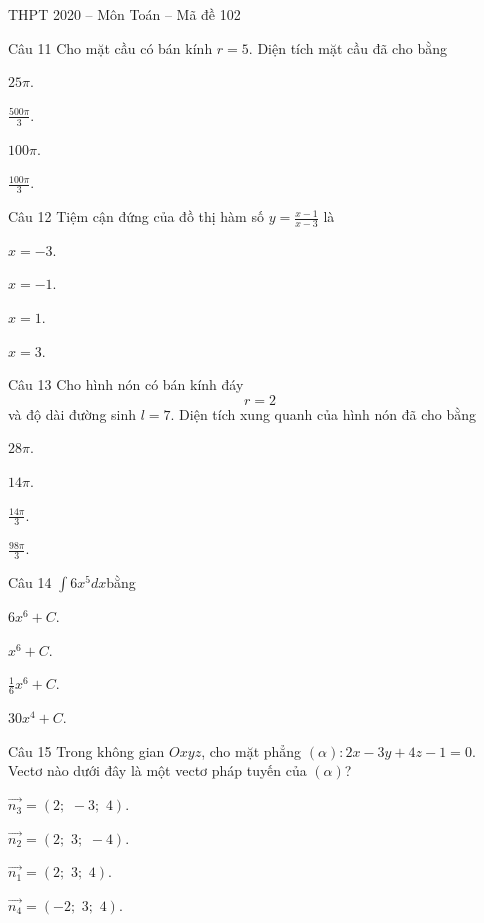\documentclass{book}
\begin{document}
\begin{quiz}{THPT 2020 – Môn Toán – Mã đề 102}
\begin{multi}[points=1]{Câu 11}
 Cho mặt cầu có bán kính $r=5$. Diện tích mặt cầu đã cho bằng

\item  $25\pi $.	
\item  $\frac{500\pi }{3}$.	
\item*  $100\pi $.	
\item  $\frac{100\pi }{3}$.
\end{multi}

\begin{multi}[points=1]{Câu 12}
 Tiệm cận đứng của đồ thị hàm số $y=\frac{x-1}{x-3}$ là

\item  $x=-3$.	
\item  $x=-1$.	
\item  $x=1$.	
\item*  $x=3$.
\end{multi}

\begin{multi}[points=1]{Câu 13}
 Cho hình nón có bán kính đáy \[r=2\] và độ dài đường sinh $l=7$. Diện tích xung quanh của hình nón đã cho bằng

\item  $28\pi $.	
\item*  $14\pi $.	
\item  $\frac{14\pi }{3}$.	
\item  $\frac{98\pi }{3}$.
\end{multi}

\begin{multi}[points=1]{Câu 14}
 $\int{6{{x}^{5}}dx}$bằng

\item  $6{{x}^{6}}+C$.	
\item*  ${{x}^{6}}+C$.	
\item  $\frac{1}{6}{{x}^{6}}+C$.	
\item  $30{{x}^{4}}+C$.
\end{multi}

\begin{multi}[points=1]{Câu 15}
 Trong không gian $Oxyz$, cho mặt phẳng $\left( \alpha  \right):2x-3y+4z-1=0$. Vectơ nào dưới đây là một vectơ pháp tuyến của $\left( \alpha  \right)$? 

\item*  $\overrightarrow{{{n}_{3}}}=\left( 2;\,\,-3;\,\,4 \right)$.	
\item  $\overrightarrow{{{n}_{2}}}=\left( 2;\,\,3;\,\,-4 \right)$.	
\item  $\overrightarrow{{{n}_{1}}}=\left( 2;\,\,3;\,\,4 \right)$.	
\item  $\overrightarrow{{{n}_{4}}}=\left( -2;\,\,3;\,\,4 \right)$.
\end{multi}


\end{quiz}
\end{document}
